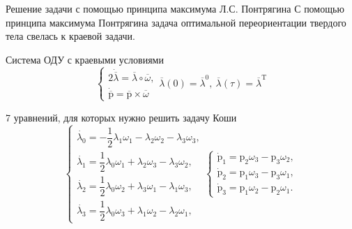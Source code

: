 \documentclass[10pt,utf8,presentation,notheorems,xcolor=dvipsnames,compress]{beamer}
\begin{document}
\begin{frame}[t]{Решение задачи с помощью принципа максимума Л.С. Понтрягина}
С помощью принципа максимума Понтрягина задача оптимальной переориентации твердого тела свелась к краевой задачи.
\begin{block}{Система ОДУ с краевыми условиями}
\begin{equation}
\begin{cases}
	2\dot{\overline{\lambda}} = \overline{\lambda} \circ \overline{\omega},\\
	\dot{\overline{\text{p}}} = \overline{\text{p}} \times \overline{\omega}
\end{cases}
\overline{\lambda}(0) = \overline{\lambda}^{0},\ \overline{\lambda}(\tau) = \overline{\lambda}^\text{T}
\end{equation}
\end{block}

\begin{block}{7 уравнений, для которых нужно решить задачу Коши}
\begin{equation}
\begin{cases}
\dot{\lambda_{0}} = -\dfrac{1}{2} \lambda_{1}\omega_{1} - \lambda_{2}\omega_{2} - \lambda_{3}\omega_{3},\\
\dot{\lambda_{1}} = \dfrac{1}{2} \lambda_{0}\omega_{1} + \lambda_{2}\omega_{3} - \lambda_{3}\omega_{2},\\
\dot{\lambda_{2}} = \dfrac{1}{2} \lambda_{0}\omega_{2} + \lambda_{3}\omega_{1} - \lambda_{1}\omega_{3},\\
\dot{\lambda_{3}} = \dfrac{1}{2} \lambda_{0}\omega_{3} + \lambda_{1}\omega_{2} - \lambda_{2}\omega_{1},
\end{cases}
\begin{cases}
\dot{\text{p}}_1 = \text{p}_2 \omega_3 - \text{p}_3 \omega_2,\\
\dot{\text{p}}_2 = \text{p}_1 \omega_3 - \text{p}_3 \omega_1,\\
\dot{\text{p}}_3 = \text{p}_1 \omega_2 - \text{p}_2 \omega_1.
\end{cases}
\end{equation}
\end{block}
\end{frame}
\end{document}
